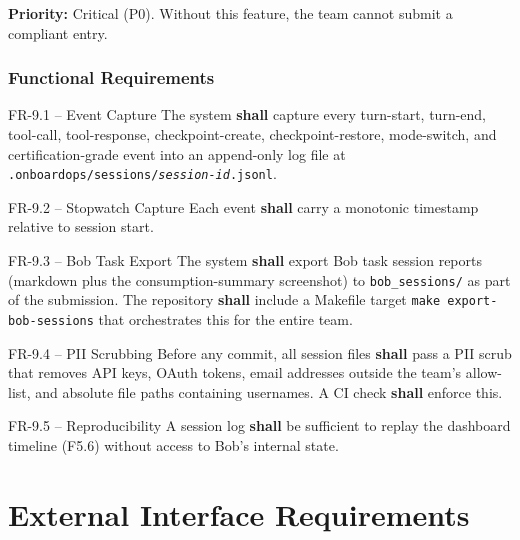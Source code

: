 \documentclass[11pt,letterpaper]{article}
\newcommand{\shall}{\textbf{shall}}
\begin{document}
\textbf{Priority:} Critical (P0). Without this feature, the team cannot submit a compliant entry.

\subsubsection{Functional Requirements}

\begin{reqbox}{FR-9.1 -- Event Capture}
The system \shall{} capture every turn-start, turn-end, tool-call, tool-response, checkpoint-create, checkpoint-restore, mode-switch, and certification-grade event into an append-only log file at \texttt{.onboardops/sessions/\textit{session-id}.jsonl}.
\end{reqbox}

\begin{reqbox}{FR-9.2 -- Stopwatch Capture}
Each event \shall{} carry a monotonic timestamp relative to session start.
\end{reqbox}

\begin{reqbox}{FR-9.3 -- Bob Task Export}
The system \shall{} export Bob task session reports (markdown plus the consumption-summary screenshot) to \texttt{bob\_sessions/} as part of the submission. The repository \shall{} include a Makefile target \texttt{make export-bob-sessions} that orchestrates this for the entire team.
\end{reqbox}

\begin{reqbox}{FR-9.4 -- PII Scrubbing}
Before any commit, all session files \shall{} pass a PII scrub that removes API keys, OAuth tokens, email addresses outside the team's allow-list, and absolute file paths containing usernames. A CI check \shall{} enforce this.
\end{reqbox}

\begin{reqbox}{FR-9.5 -- Reproducibility}
A session log \shall{} be sufficient to replay the dashboard timeline (F5.6) without access to Bob's internal state.
\end{reqbox}

\section{External Interface Requirements}
\end{document}
